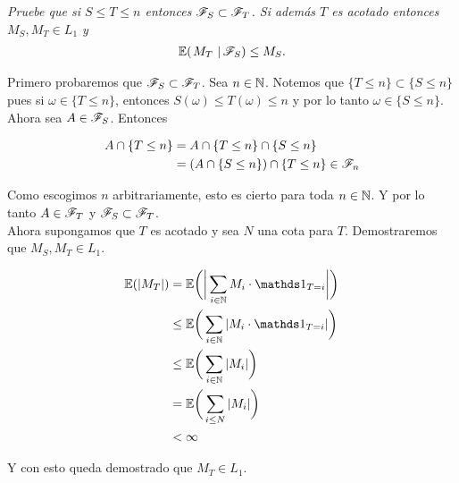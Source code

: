 \emph{
	Pruebe que si $S\leq T\leq n$ entonces $\mathscr{F}_S\subset\mathscr{F}_T$. Si adem\'as $T$ es acotado entonces $M_S,M_T \in L_1$ y 
	\begin{align}
		\espc{M_T}{\F_S}\leq M_S.
	\end{align}	
}

	Primero probaremos que $\mathscr{F}_S \subset \mathscr{F}_T$. Sea $n \in \mathbb{N}$. Notemos que $\{ T \leq n \} \subset \{ S \leq n \}$ pues
	si $\omega \in \{ T \leq n \}$, entonces $S(\omega) \leq T(\omega) \leq n $ y por lo tanto $\omega \in \{ S \leq n \}$.\\

	Ahora sea $A \in \mathscr{F}_S$. Entonces

	\begin{align}
		A \cap \{ T \leq n \} 	&=		A  \cap \{ T \leq n \} \cap \{ S \leq n \} \\
								&=		(A  \cap \{ S \leq n \}) \cap \{ T \leq n \} \in \mathscr{F}_n
	\end{align}

	Como escogimos $n$ arbitrariamente, esto es cierto para toda $n \in \mathbb{N}$. Y por lo tanto $A \in \mathscr{F}_T$ y $\mathscr{F}_S \subset \mathscr{F}_T$.\\

	Ahora supongamos que $T$ es acotado y sea $N$ una cota para $T$. Demostraremos que $M_S,M_T \in L_1$.
	
	\begin{align}
		\E(|M_T|) 	&=		\E\bigg(	\bigg| \sum_{i \in \N} M_i \cdot \indic_{T = i} \bigg|	\bigg) \\ 
					&\leq	\E\bigg(	\sum_{i \in \N} |M_i \cdot \indic_{T = i} |\bigg) \\
					&\leq	\E\bigg(	\sum_{i \in \N} |M_i|\bigg) \\
					&=		\E\bigg(	\sum_{i \leq N} |M_i|\bigg) \\
					&< 		\infty
	\end{align}
	
	Y con esto queda demostrado que $M_T \in L_1$.
	
	